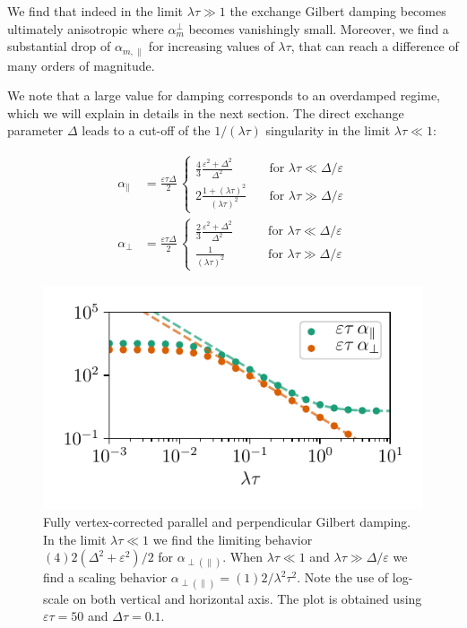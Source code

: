 We find that indeed in the limit $\lambda\tau\gg1$ the exchange Gilbert damping becomes ultimately anisotropic where $\alpha_{m}^{\perp}$ becomes vanishingly small. Moreover, we find a substantial drop of $\alpha_{m,\parallel}$ for increasing values of $\lambda\tau$, that can reach a difference of many orders of magnitude. 

We note that a large value for damping corresponds to an overdamped regime, which we will explain in details in the next section. The direct exchange parameter $\Delta$ leads to a cut-off of the $1/(\lambda\tau)$ singularity in the limit $\lambda\tau\ll1$:

\begin{align}
\label{eq:alphapara}
    \alpha_{\parallel} &= 
    \frac{\varepsilon\tau\Delta}{2}\,  \begin{cases}
        \frac{4}{3}\frac{\varepsilon^2+\Delta^2}{\Delta^2}
            &\quad \text{for } \lambda\tau        \ll \Delta/\varepsilon\\
        2\frac{1+(\lambda\tau)^2}{(\lambda\tau)^2}
            &\quad \text{for } \lambda\tau \gg \Delta/\varepsilon 
    \end{cases}\\
    \label{eq:alphaperp}
    \alpha_{\perp} &= \frac{\varepsilon\tau\Delta}{2}\,
    \begin{cases}
        \frac{2}{3}\frac{\varepsilon^2+\Delta^2}{\Delta^2}
            \quad\quad &\text{for } \lambda\tau        \ll \Delta/\varepsilon\\
        \frac{1}{(\lambda\tau)^2}
            \quad &\text{for } \lambda\tau \gg \Delta/\varepsilon 
    \end{cases}
\end{align}
\begin{figure}
    \centering
    \includegraphics[width=0.75\linewidth]{gfx/alpha_full}
    \caption{Fully vertex-corrected parallel and perpendicular Gilbert damping. In the limit $\lambda\tau\ll1$ we find the limiting behavior $(4)2(\Delta^2+\varepsilon^2)/2$ for $\alpha_{\perp(\parallel)}$. When $\lambda\tau\ll 1$ and $\lambda\tau\gg\Delta/\varepsilon$ we find a scaling behavior $\alpha_{\perp(\parallel)}=(1)2/\lambda^2\tau^2$. Note the use of log-scale on both vertical and horizontal axis. The plot is obtained using $\varepsilon\tau=50$ and $\Delta\tau=0.1$. }
    \label{fig:alpha_plot}
\end{figure}



